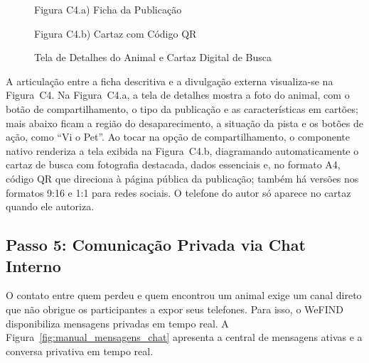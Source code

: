 \begin{figure}[H]
    \centering
    \caption{Tela de Detalhes do Animal e Cartaz Digital de Busca}
    \label{fig:manual_detalhes_cartaz}
    \vspace{0.15cm}
    \begin{minipage}[t]{0.48\textwidth}
        \centering
        \par\vspace{0.12cm}
        {\small Figura C4.a) Ficha da Publicação}
    \end{minipage}
    \hfill
    \begin{minipage}[t]{0.48\textwidth}
        \centering
        \par\vspace{0.12cm}
        {\small Figura C4.b) Cartaz com Código QR}
    \end{minipage}
    \par\vspace{0.1cm}
\end{figure}

A articulação entre a ficha descritiva e a divulgação externa visualiza-se na Figura~C4. Na Figura~C4.a, a tela de detalhes mostra a foto do animal, com o botão de compartilhamento, o tipo da publicação e as características em cartões; mais abaixo ficam a região do desaparecimento, a situação da pista e os botões de ação, como ``Vi o Pet''. Ao tocar na opção de compartilhamento, o componente nativo renderiza a tela exibida na Figura~C4.b, diagramando automaticamente o cartaz de busca com fotografia destacada, dados essenciais e, no formato A4, código QR que direciona à página pública da publicação; também há versões nos formatos 9:16 e 1:1 para redes sociais. O telefone do autor só aparece no cartaz quando ele autoriza.

\clearpage

\subsection*{Passo 5: Comunicação Privada via Chat Interno}
\noindent
O contato entre quem perdeu e quem encontrou um animal exige um canal direto que não obrigue os participantes a expor seus telefones. Para isso, o WeFIND disponibiliza mensagens privadas em tempo real. A Figura~\ref{fig:manual_mensagens_chat} apresenta a central de mensagens ativas e a conversa privativa em tempo real.

